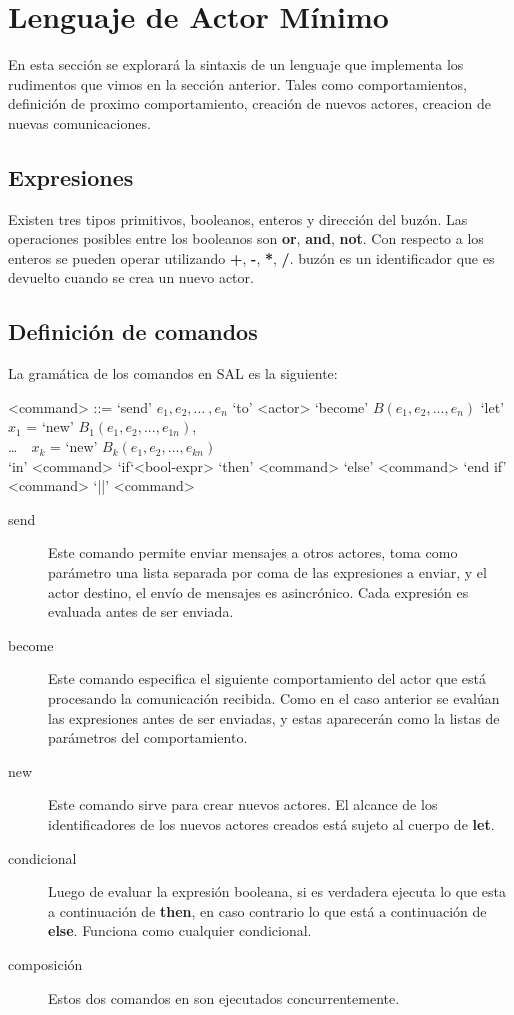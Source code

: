 \chapter{Lenguaje de Actor Mínimo}

En esta sección se explorará la sintaxis de un lenguaje que implementa los rudimentos que vimos en la sección anterior. 
Tales como comportamientos, definición de proximo comportamiento, creación de nuevos actores, creacion de nuevas comunicaciones. 

\section{Expresiones}
Existen tres tipos primitivos, booleanos, enteros y dirección del buzón. Las operaciones
posibles entre los booleanos son \textbf{or}, \textbf{and}, \textbf{not}. Con
respecto a los enteros se pueden operar utilizando \textbf{+}, \textbf{-},
\textbf{*}, \textbf{/}.  buzón es un identificador que es devuelto cuando se
crea un nuevo actor.

\section{Definición de comandos}
La gramática de los comandos en SAL es la siguiente:

\begin{grammar}
  <command> ::= `send' $e_1, e_2, \ldots\ , e_n$ `to' <actor>  
  \alt `become' $B(e_1, e_2, ..., e_n)$
  \alt `let' $x_1$ = `new' $B_1(e_1, e_2, ..., e_{1n})$, \\
   \ldots\ \ $x_k$ = `new' $B_k(e_1, e_2, ..., e_{kn})$       \\
  `in' <command> 
  \alt `if`<bool-expr> `then' <command> `else' <command> `end if'
  \alt <command> `||' <command>
\end{grammar}

\begin{description}
\item [send] Este comando permite enviar mensajes a otros actores, toma como
  parámetro una lista separada por coma de las expresiones a enviar, y el actor
  destino, el envío de mensajes es asincrónico. Cada expresión es evaluada antes
  de ser enviada.
\item [become] Este comando especifica el siguiente comportamiento del actor
  que está procesando la comunicación recibida. Como en el caso anterior se evalúan
  las expresiones antes de ser enviadas, y estas aparecerán como la listas de
  parámetros del comportamiento. 
\item[new] Este comando sirve para crear nuevos actores. El alcance de los
  identificadores de los nuevos actores creados está sujeto al cuerpo de \textbf{let}.
\item[condicional] Luego de evaluar la expresión booleana, si es verdadera
  ejecuta lo que esta a continuación de \textbf{then}, en caso contrario lo que está a
  continuación de \textbf{else}. Funciona como cualquier condicional.
\item[composición] Estos dos comandos en \SAL son ejecutados concurrentemente.
 
\end{description}

